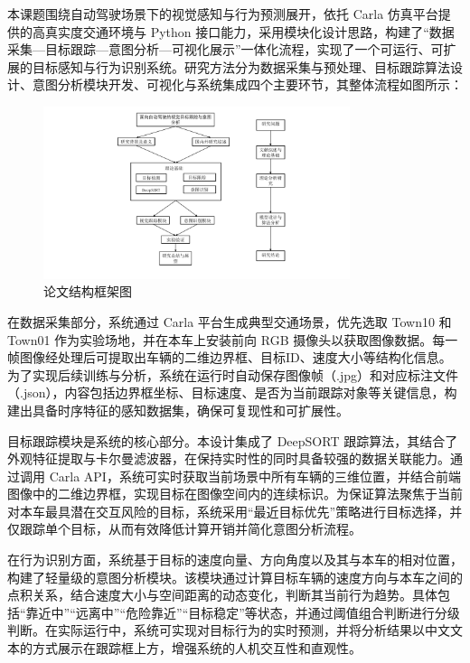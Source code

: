 本课题围绕自动驾驶场景下的视觉感知与行为预测展开，依托 Carla 仿真平台提供的高真实度交通环境与 Python 接口能力，采用模块化设计思路，构建了“数据采集—目标跟踪—意图分析—可视化展示”一体化流程，实现了一个可运行、可扩展的目标感知与行为识别系统。研究方法分为数据采集与预处理、目标跟踪算法设计、意图分析模块开发、可视化与系统集成四个主要环节，其整体流程如图所示：
\begin{figure}[H]
    \centering
    \includegraphics[width=0.8\textwidth]{images/图1 系统技术路线图.pdf}  %
    \caption{论文结构框架图}
    \label{fig:example_image}  %
\end{figure}

在数据采集部分，系统通过 Carla 平台生成典型交通场景，优先选取 Town10 和 Town01 作为实验场地，并在本车上安装前向 RGB 摄像头以获取图像数据。每一帧图像经处理后可提取出车辆的二维边界框、目标ID、速度大小等结构化信息。为了实现后续训练与分析，系统在运行时自动保存图像帧（.jpg）和对应标注文件（.json），内容包括边界框坐标、目标速度、是否为当前跟踪对象等关键信息，构建出具备时序特征的感知数据集，确保可复现性和可扩展性。

目标跟踪模块是系统的核心部分。本设计集成了 DeepSORT 跟踪算法，其结合了外观特征提取与卡尔曼滤波器，在保持实时性的同时具备较强的数据关联能力。通过调用 Carla API，系统可实时获取当前场景中所有车辆的三维位置，并结合前端图像中的二维边界框，实现目标在图像空间内的连续标识。为保证算法聚焦于当前对本车最具潜在交互风险的目标，系统采用“最近目标优先”策略进行目标选择，并仅跟踪单个目标，从而有效降低计算开销并简化意图分析流程。

在行为识别方面，系统基于目标的速度向量、方向角度以及其与本车的相对位置，构建了轻量级的意图分析模块。该模块通过计算目标车辆的速度方向与本车之间的点积关系，结合速度大小与空间距离的动态变化，判断其当前行为趋势。具体包括“靠近中”“远离中”“危险靠近”“目标稳定”等状态，并通过阈值组合判断进行分级判断。在实际运行中，系统可实现对目标行为的实时预测，并将分析结果以中文文本的方式展示在跟踪框上方，增强系统的人机交互性和直观性。


